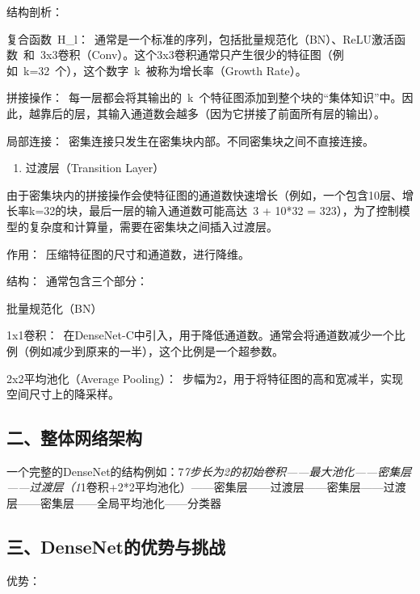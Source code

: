 结构剖析：

复合函数~H\_l：~通常是一个标准的序列，包括批量规范化（BN）、ReLU激活函数~和~3x3卷积（Conv）。这个3x3卷积通常只产生很少的特征图（例如~k=32~个），这个数字~k~被称为增长率（Growth Rate）。

拼接操作：~每一层都会将其输出的~k~个特征图添加到整个块的``集体知识''中。因此，越靠后的层，其输入通道数会越多（因为它拼接了前面所有层的输出）。

局部连接：~密集连接只发生在密集块内部。不同密集块之间不直接连接。

\begin{enumerate}
\def\labelenumi{\arabic{enumi}.}
\setcounter{enumi}{1}
\tightlist
\item
  过渡层（Transition Layer）
\end{enumerate}

由于密集块内的拼接操作会使特征图的通道数快速增长（例如，一个包含10层、增长率k=32的块，最后一层的输入通道数可能高达~3 + 10*32 = 323），为了控制模型的复杂度和计算量，需要在密集块之间插入过渡层。

作用：~压缩特征图的尺寸和通道数，进行降维。

结构：~通常包含三个部分：

批量规范化（BN）

1x1卷积：~在DenseNet-C中引入，用于降低通道数。通常会将通道数减少一个比例（例如减少到原来的一半），这个比例是一个超参数。

2x2平均池化（Average Pooling）：~步幅为2，用于将特征图的高和宽减半，实现空间尺寸上的降采样。

\hypertarget{ux4e8cux6574ux4f53ux7f51ux7edcux67b6ux6784}{%
\subsection{二、整体网络架构}\label{ux4e8cux6574ux4f53ux7f51ux7edcux67b6ux6784}}

一个完整的DenseNet的结构例如：7\emph{7步长为2的初始卷积------最大池化------密集层------过渡层（1}1卷积+2*2平均池化）------密集层------过渡层------密集层------过渡层------密集层------全局平均池化------分类器

\hypertarget{ux4e09densenetux7684ux4f18ux52bfux4e0eux6311ux6218}{%
\subsection{三、DenseNet的优势与挑战}\label{ux4e09densenetux7684ux4f18ux52bfux4e0eux6311ux6218}}

优势：

